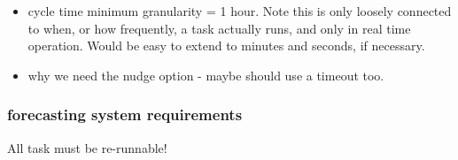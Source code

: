 \documentclass[11pt,a4paper]{article}
\begin{document}
\begin{itemize}
    \item cycle time minimum granularity = 1 hour. Note this is
        only loosely connected to when, or how frequently, a task
        actually runs, and only in real time operation. Would be easy to
        extend to minutes and seconds, if necessary.

    \item why we need the nudge option - maybe should use a timeout too.
\end{itemize}

\subsubsection{forecasting system requirements}

All task must be re-runnable!
\end{document}
